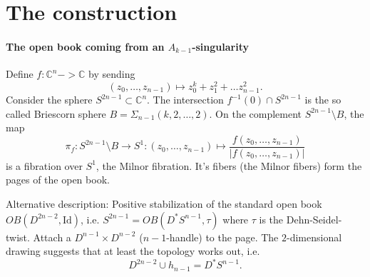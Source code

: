 \section*{The construction}

\paragraph*{The open book coming from an $A_{k-1}$-singularity}
Define $f\colon \mathbb C^n -> \mathbb C$ by sending
\[
    (z_0, \dots, z_{n-1}) \mapsto z_0^k + z_1^2 + \dots z_{n-1}^2.  
\]
Consider the sphere $S^{2n-1} \subset \mathbb C^n$.
The intersection $f^{-1}(0) \cap S^{2n-1}$ is the so called Briescorn sphere $B = \Sigma_{n-1}(k,2,\dots,2)$.
On the complement $S^{2n-1} \setminus B$, the map
\[
    \pi_f\colon S^{2n-1}\setminus B \to S^1\colon (z_0, \dots, z_{n-1}) \mapsto \frac{f(z_0, \dots, z_{n-1})}{|f(z_0, \dots, z_{n-1})|}
\]
is a fibration over $S^1$, the Milnor fibration.
It's fibers (the Milnor fibers) form the pages of the open book.

Alternative description: Positive stabilization of the standard open book $OB(D^{2n-2}, \mathrm{Id})$,
i.e. $S^{2n-1} = OB(D^*S^{n-1}, \tau)$ where $\tau$ is the Dehn-Seidel-twist.
Attach a $D^{n-1} \times D^{n-2}$ ($n-1$-handle) to the page.
The $2$-dimensional drawing suggests that at least the topology works out, i.e.
\[
    D^{2n-2} \cup h_{n-1} = D^*S^{n-1}.
\]
